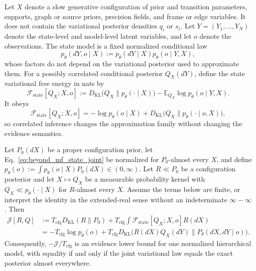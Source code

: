 Let $X$ denote a slow generative configuration of prior and transition parameters, supports, graph or source priors, precision fields, and frame or edge variables. It does not contain the variational posterior densities $q_i$ or $s_i$. Let $Y=(Y_1,\ldots,Y_N)$ denote the state-level and model-level latent variables, and let $o$ denote the observations. The state model is a fixed normalized conditional law
\begin{equation}
p_\theta(dY,o\mid X)
:=p_\theta(dY\mid X)p_\theta(o\mid Y,X),
\label{eq:beyond_mf_state_joint}
\end{equation}
whose factors do not depend on the variational posterior used to approximate them. For a possibly correlated conditional posterior $Q_X(dY)$, define the state variational free energy in nats by
\begin{equation}
\mathcal{F}_{\mathrm{state}}[Q_X;X,o]
:=D_{\mathrm{KL}}\bigl(Q_X\|p_\theta(\cdot\mid X)\bigr)
-\mathbb{E}_{Q_X}\log p_\theta(o\mid Y,X).
\label{eq:beyond_mf_state_vfe}
\end{equation}
It obeys
\begin{equation}
\mathcal{F}_{\mathrm{state}}[Q_X;X,o]
=-\log p_\theta(o\mid X)
+D_{\mathrm{KL}}\bigl(Q_X\|p_\theta(\cdot\mid o,X)\bigr),
\label{eq:beyond_mf_state_elbo_identity}
\end{equation}
so correlated inference changes the approximation family without changing the evidence semantics.

\begin{theorem}
\label{thm:nested_state_configuration_vfe}
Let $P_0(dX)$ be a proper configuration prior, let Eq.~\eqref{eq:beyond_mf_state_joint} be normalized for $P_0$-almost every $X$, and define $p_\theta(o):=\int p_\theta(o\mid X)P_0(dX)\in(0,\infty)$. Let $R\ll P_0$ be a configuration posterior and let $X\mapsto Q_X$ be a measurable probability kernel with $Q_X\ll p_\theta(\cdot\mid X)$ for $R$-almost every $X$. Assume the terms below are finite, or interpret the identity in the extended-real sense without an indeterminate $\infty-\infty$. Then
\begin{align}
\mathcal{J}[R,Q]
&:=T_{\mathrm{cfg}}D_{\mathrm{KL}}(R\|P_0)
+T_{\mathrm{cfg}}\int
\mathcal{F}_{\mathrm{state}}[Q_X;X,o]R(dX)
\nonumber\\
&=-T_{\mathrm{cfg}}\log p_\theta(o)
+T_{\mathrm{cfg}}D_{\mathrm{KL}}
\bigl(R(dX)Q_X(dY)\|P_\theta(dX,dY\mid o)\bigr).
\label{eq:nested_state_configuration_identity}
\end{align}
Consequently, $-\mathcal{J}/T_{\mathrm{cfg}}$ is an evidence lower bound for one normalized hierarchical model, with equality if and only if the joint variational law equals the exact posterior almost everywhere.
\end{theorem}

